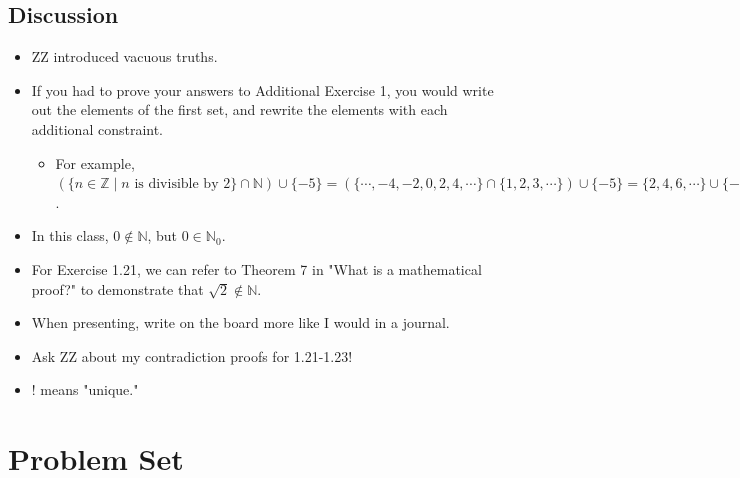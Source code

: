 \documentclass[titlepage]{article}
\theoremstyle{definition}
\newcommand{\N}{\mathbb{N}}
\newcommand{\Z}{\mathbb{Z}}
\begin{document}
\subsection{Discussion}
\begin{itemize}
    \item {}ZZ introduced vacuous truths.
    \item If you had to prove your answers to Additional Exercise 1, you would write out the elements of the first set, and rewrite the elements with each additional constraint.
    \begin{itemize}
        \item For example, $(\{n\in\Z\mid n\text{ is divisible by }2\}\cap\N)\cup\{-5\}=(\{\cdots,-4,-2,0,2,4,\cdots\}\cap\{1,2,3,\cdots\})\cup\{-5\}=\{2,4,6,\cdots\}\cup\{-5\}$.
    \end{itemize}
    \item In this class, $0\notin\N$, but $0\in\N_0$.
    \item For Exercise 1.21, we can refer to Theorem 7 in "What is a mathematical proof?" to demonstrate that $\sqrt{2}\notin\N$.
    \item When presenting, write on the board more like I would in a journal.
    \item Ask ZZ about my contradiction proofs for 1.21-1.23!
    \item {}! means "unique."
\end{itemize}



\section{Problem Set}
\end{document}
